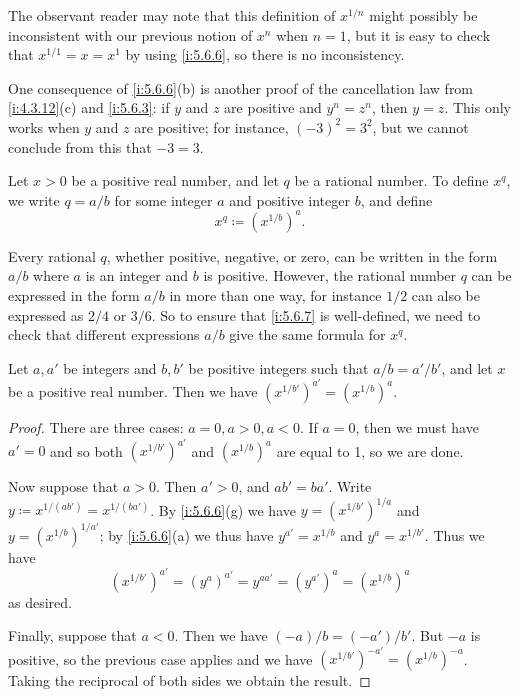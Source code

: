 \begin{note}
  The observant reader may note that this definition of \(x^{1 / n}\) might possibly be inconsistent with our previous notion of \(x^n\) when \(n = 1\), but it is easy to check that \(x^{1 / 1} = x = x^1\) by using \cref{i:5.6.6}, so there is no inconsistency.
\end{note}

\begin{note}
  One consequence of \cref{i:5.6.6}(b) is another proof of the cancellation law from \cref{i:4.3.12}(c) and \cref{i:5.6.3}:
  if \(y\) and \(z\) are positive and \(y^n = z^n\), then \(y = z\).
  This only works when \(y\) and \(z\) are positive;
  for instance, \((-3)^2 = 3^2\), but we cannot conclude from this that \(-3 = 3\).
\end{note}

\begin{defn}\label{i:5.6.7}
  Let \(x > 0\) be a positive real number, and let \(q\) be a rational number.
  To define \(x^q\), we write \(q = a / b\) for some integer \(a\) and positive integer \(b\), and define
  \[
    x^q \coloneqq (x^{1 / b})^a.
  \]
\end{defn}

\begin{note}
  Every rational \(q\), whether positive, negative, or zero, can be written in the form \(a / b\) where \(a\) is an integer and \(b\) is positive.
  However, the rational number \(q\) can be expressed in the form \(a / b\) in more than one way, for instance \(1 / 2\) can also be expressed as \(2 / 4\) or \(3 / 6\).
  So to ensure that \cref{i:5.6.7} is well-defined, we need to check that different expressions \(a / b\) give the same formula for \(x^q\).
\end{note}

\begin{lem}\label{i:5.6.8}
  Let \(a, a'\) be integers and \(b, b'\) be positive integers such that \(a / b = a' / b'\), and let \(x\) be a positive real number.
  Then we have \((x^{1 / b'})^{a'} = (x^{1 / b})^a\).
\end{lem}

\begin{proof}
  There are three cases: \(a = 0, a > 0, a < 0\).
  If \(a = 0\), then we must have \(a' = 0\) and so both \((x^{1 / b'})^{a'}\) and \((x^{1 / b})^a\) are equal to 1, so we are done.

  Now suppose that \(a > 0\).
  Then \(a' > 0\), and \(ab' = ba'\).
  Write \(y \coloneqq x^{1 / (ab')} = x^{1 / (ba')}\).
  By \cref{i:5.6.6}(g) we have \(y = (x^{1 / b'})^{1 / a}\) and \(y = (x^{1 / b})^{1 / a'}\);
  by \cref{i:5.6.6}(a) we thus have \(y^{a'} = x^{1 / b}\) and \(y^a = x^{1 / b'}\).
  Thus we have
  \[
    (x^{1 / b'})^{a'} = (y^a)^{a'} = y^{aa'} = (y^{a'})^a = (x^{1 / b})^a
  \]
  as desired.

  Finally, suppose that \(a < 0\).
  Then we have \((-a) / b = (-a') / b'\).
  But \(-a\) is positive, so the previous case applies and we have \((x^{1 / b'})^{-a'} = (x^{1 / b})^{-a}\).
  Taking the reciprocal of both sides we obtain the result.
\end{proof}

